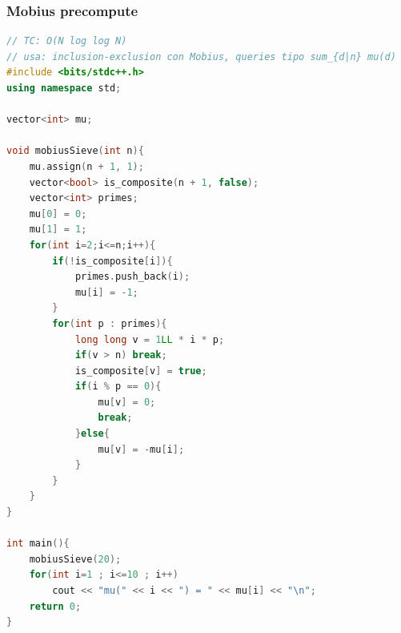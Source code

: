 \subsubsection{Mobius precompute}
\begin{lstlisting}[style=mystyle, language=C++]
// TC: O(N log log N)
// usa: inclusion-exclusion con Mobius, queries tipo sum_{d|n} mu(d)
#include <bits/stdc++.h>
using namespace std;

vector<int> mu;

void mobiusSieve(int n){
	mu.assign(n + 1, 1);
	vector<bool> is_composite(n + 1, false);
	vector<int> primes;
	mu[0] = 0;
	mu[1] = 1;
	for(int i=2;i<=n;i++){
		if(!is_composite[i]){
			primes.push_back(i);
			mu[i] = -1;
		}
		for(int p : primes){
			long long v = 1LL * i * p;
			if(v > n) break;
			is_composite[v] = true;
			if(i % p == 0){
				mu[v] = 0;
				break;
			}else{
				mu[v] = -mu[i];
			}
		}
	}
}

int main(){
	mobiusSieve(20);
	for(int i=1 ; i<=10 ; i++) 
		cout << "mu(" << i << ") = " << mu[i] << "\n";
	return 0;
}
\end{lstlisting}
